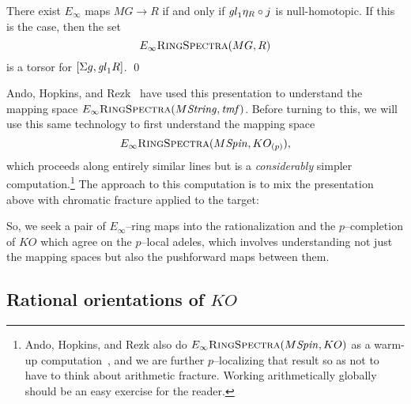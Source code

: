 \begin{corollary}
There exist \(E_\infty\) maps \(MG \to R\) if and only if \(\mathit{gl}_1 \eta_R \circ j\) is null-homotopic.  If this is the case, then the set \[E_\infty\normalfont\textsc{RingSpectra}(MG, R)\] is a torsor for \([\Sigma g, \mathit{gl}_1 R]\). \qed
\end{corollary}

Ando, Hopkins, and Rezk~\cite{AHR} have used this presentation to understand the mapping space \(E_\infty\normalfont\textsc{RingSpectra}(M\mathit{String}, \mathit{tmf})\).  Before turning to this, we will use this same technology to first understand the mapping space \[E_\infty\normalfont\textsc{RingSpectra}(M\mathit{Spin}, KO_{(p)}),\] which proceeds along entirely similar lines but is a \emph{considerably} simpler computation.\footnote{Ando, Hopkins, and Rezk also do \(E_\infty\normalfont\textsc{RingSpectra}(M\mathit{Spin}, KO)\) as a warm-up computation~\cite[Section 7]{AHR}, and we are further \(p\)--localizing that result so as not to have to think about arithmetic fracture.  Working arithmetically globally should be an easy exercise for the reader.}  The approach to this computation is to mix the presentation above with chromatic fracture applied to the target:
\begin{center}
\end{center}
So, we seek a pair of \(E_\infty\)--ring maps into the rationalization and the \(p\)--completion of \(KO\) which agree on the \(p\)--local adeles, which involves understanding not just the mapping spaces but also the pushforward maps between them.





\subsection{Rational orientations of \(KO\)}

